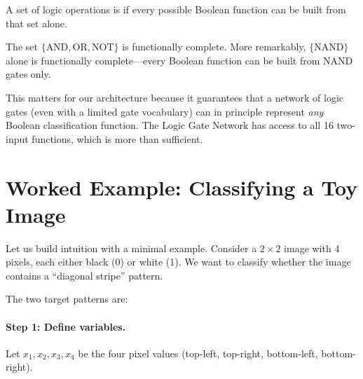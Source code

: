 \begin{definition}
A set of logic operations is  if every
possible Boolean function can be built from that set alone.
\end{definition}

The set $\{\text{AND}, \text{OR}, \text{NOT}\}$ is functionally
complete. More remarkably, $\{\text{NAND}\}$ alone is functionally
complete---every Boolean function can be built from NAND gates only.

This matters for our architecture because it guarantees that a network
of logic gates (even with a limited gate vocabulary) can in principle
represent \emph{any} Boolean classification function. The Logic Gate
Network has access to all 16 two-input functions, which is more than
sufficient.


\section{Worked Example: Classifying a Toy Image}
\label{sec:toy-example}

Let us build intuition with a minimal example. Consider a $2 \times 2$
image with 4 pixels, each either black (0) or white (1). We want to
classify whether the image contains a ``diagonal stripe'' pattern.

The two target patterns are:
\begin{center}
\end{center}

\paragraph{Step 1: Define variables.}
Let $x_1, x_2, x_3, x_4$ be the four pixel values (top-left,
top-right, bottom-left, bottom-right).

